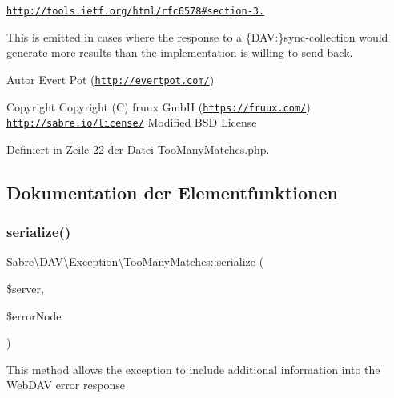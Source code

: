 \href{http://tools.ietf.org/html/rfc6578#section-3.2}{\tt http\+://tools.\+ietf.\+org/html/rfc6578\#section-\/3.}

This is emitted in cases where the response to a \{D\+AV\+:\}sync-\/collection would generate more results than the implementation is willing to send back.

\begin{DoxyAuthor}{Autor}
Evert Pot (\href{http://evertpot.com/}{\tt http\+://evertpot.\+com/}) 
\end{DoxyAuthor}
\begin{DoxyCopyright}{Copyright}
Copyright (C) fruux GmbH (\href{https://fruux.com/}{\tt https\+://fruux.\+com/})  \href{http://sabre.io/license/}{\tt http\+://sabre.\+io/license/} Modified B\+SD License 
\end{DoxyCopyright}


Definiert in Zeile 22 der Datei Too\+Many\+Matches.\+php.



\subsection{Dokumentation der Elementfunktionen}
\mbox{\label{class_sabre_1_1_d_a_v_1_1_exception_1_1_too_many_matches_af2c523f6962e53f6b39721eb2ac2c1a4}} 
\subsubsection{\texorpdfstring{serialize()}{serialize()}}
{\footnotesize\ttfamily Sabre\textbackslash{}\+D\+A\+V\textbackslash{}\+Exception\textbackslash{}\+Too\+Many\+Matches\+::serialize (\begin{DoxyParamCaption}\item[{\mbox{\hyperlink{class_sabre_1_1_d_a_v_1_1_server}{D\+A\+V\textbackslash{}\+Server}}}]{\$server,  }\item[{\textbackslash{}D\+O\+M\+Element}]{\$error\+Node }\end{DoxyParamCaption})}

This method allows the exception to include additional information into the Web\+D\+AV error response


